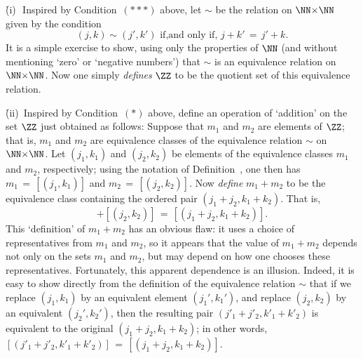{{        \h (i)\,\, Inspired by Condition~$({\ast}{\ast}{\ast})$ above, let ${\sim}$ be the relation on ${\NN}{\times}{\NN}$ given by the condition
        \begin{displaymath}
        (j,k) {\sim} (j',k') \mbox{ if,and only if, } j+k' \,=\, j'+k.
        \end{displaymath}
    It is a simple exercise to show, using only the properties of ${\NN}$ (and without mentioning `zero' or `negative numbers') that ${\sim}$ is an equivalence relation on ${\NN}{\times}{\NN}$.
    Now one simply {\em defines} ${\ZZ}$ to be the quotient set of this equivalence relation.

        \h (ii)\, Inspired by Condition~$({\ast})$ above, define an operation of `addition' on the set ${\ZZ}$ just obtained as follows:
    Suppose that $m_{1}$ and $m_{2}$ are elements of ${\ZZ}$; that is, $m_{1}$ and $m_{2}$ are equivalence classes of the equivalence relation $\sim$ on ${\NN}{\times}{\NN}$.
    Let $(j_{1},k_{1})$ and $(j_{2},k_{2})$ be elements of the equivalence classes $m_{1}$ and $m_{2}$, respectively;
    using the notation of Definition~, one then has $m_{1} \,=\, [(j_{1},k_{1})]$ and $m_{2} \,=\, [(j_{2},k_{2})]$.
    Now {\em define} $m_{1}+m_{2}$ to be the equivalence class containing the ordered pair $(j_{1}+j_{2},k_{1}+k_{2})$.
    That is,
        \begin{displaymath}
        [(j_{1},k_{1})] + [(j_{2},k_{2})] \,=\, [(j_{1}+j_{2},k_{1}+k_{2})].
        \end{displaymath}
        This `definition' of $m_{1}+m_{2}$ has an obvious flaw: it uses a choice of representatives from $m_{1}$ and $m_{2}$,
    so it appears that the value of $m_{1}+m_{2}$ depends not only on the sets $m_{1}$ and $m_{2}$, but may depend on how one chooses these representatives.
    Fortunately, this apparent dependence is an illusion.
    Indeed, it is easy to show directly from the definition of the equivalence relation ${\sim}$ that if we replace $(j_{1},k_{1})$ by an equivalent element $(j_{1}',k_{1}')$,
    and replace $(j_{2},k_{2})$ by an equivalent $(j_{2}',k_{2}')$, then the resulting pair $(j'_{1}+j'_{2},k'_{1}+k'_{2})$ is equivalent to the original $(j_{1}+j_{2},k_{1}+k_{2})$;
    in other words, $[(j'_{1}+j'_{2},k'_{1}+k'_{2})] \,=\, [(j_{1}+j_{2},k_{1}+k_{2})]$.


}}
